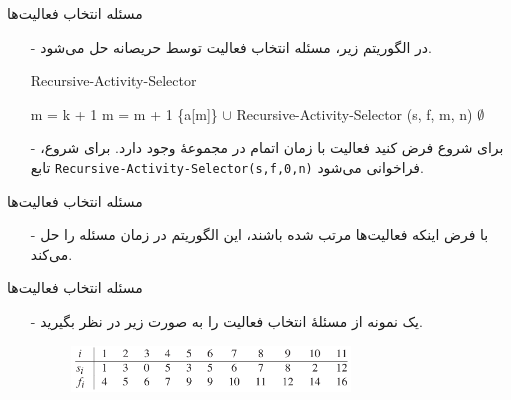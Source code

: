 \begin{frame}{‌مسئله انتخاب فعالیت‌ها}
\begin{itemize}\itemr
\item[-]
در الگوریتم زیر، مسئله انتخاب فعالیت توسط حریصانه حل می‌شود. 
\begin{algorithm}[H]\alglr
  \caption{Recursive-Activity-Selector} 
  \begin{algorithmic}[1]
   \State m = k + 1
    
   		\State m = m + 1
   	\EndWhile
   			\State \Return \{a[m]\} $\cup$ Recursive-Activity-Selector (s, f, m, n)
   		\Else
   		    \State \Return $\emptyset$
    \EndIf                   
  \end{algorithmic}
  \label{alg:merge}
\end{algorithm}
\item[-]
برای شروع فرض کنید فعالیت 
با زمان اتمام
در مجموعهٔ
 وجود دارد. برای شروع، تابع
\texttt{Recursive-Activity-Selector(s,f,0,n)}
فراخوانی می‌شود.
\end{itemize}
\end{frame}


\begin{frame}{‌مسئله انتخاب فعالیت‌ها}
\begin{itemize}\itemr
\item[-]
با فرض اینکه فعالیت‌ها مرتب شده باشند، این الگوریتم در زمان
مسئله را حل می‌کند.
\end{itemize}
\end{frame}


\begin{frame}{‌مسئله انتخاب فعالیت‌ها}
\begin{itemize}\itemr
\item[-]
یک نمونه از مسئلهٔ انتخاب فعالیت را به صورت زیر در نظر بگیرید.
\begin{figure}
\includegraphics[width=0.7\textwidth]{figs/chap05/activity-example}
\end{figure}
\end{itemize}
\end{frame}

